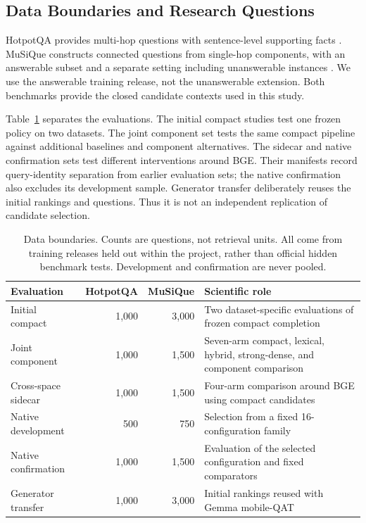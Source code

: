 \documentclass[11pt,a4paper]{article}
\begin{document}
\subsection{Data Boundaries and Research Questions}
HotpotQA provides multi-hop questions with sentence-level supporting facts
\citep{yang2018hotpotqa}. MuSiQue constructs connected questions from
single-hop components, with an answerable subset and a separate setting
including unanswerable instances \citep{trivedi2022musique}. We use the
answerable training release, not the unanswerable extension. Both benchmarks
provide the closed candidate contexts used in this study.

Table~\ref{tab:boundaries} separates the evaluations. The initial compact
studies test one frozen policy on two datasets. The joint component set tests
the same compact pipeline against additional baselines and component
alternatives. The sidecar and native confirmation sets test different
interventions around BGE. Their manifests record query-identity separation
from earlier evaluation sets; the native confirmation also excludes its
development sample. Generator transfer deliberately reuses the initial
rankings and questions. Thus it is not an independent replication of
candidate selection.

\begin{table}[t]
\centering\small
\begin{tabular}{@{}p{}rrp{}@{}}
\toprule
Evaluation & HotpotQA & MuSiQue & Scientific role\\
\midrule
Initial compact & 1,000 & 3,000 & Two dataset-specific evaluations of frozen compact completion\\
Joint component & 1,000 & 1,500 & Seven-arm compact, lexical, hybrid, strong-dense, and component comparison\\
Cross-space sidecar & 1,000 & 1,500 & Four-arm comparison around BGE using compact candidates\\
Native development & 500 & 750 & Selection from a fixed 16-configuration family\\
Native confirmation & 1,000 & 1,500 & Evaluation of the selected configuration and fixed comparators\\
Generator transfer & 1,000 & 3,000 & Initial rankings reused with Gemma mobile-QAT\\
\bottomrule
\end{tabular}
\caption{Data boundaries. Counts are questions, not retrieval units. All come
from training releases held out within the project, rather than official hidden
benchmark tests. Development and confirmation are never pooled.}
\label{tab:boundaries}
\end{table}
\end{document}
